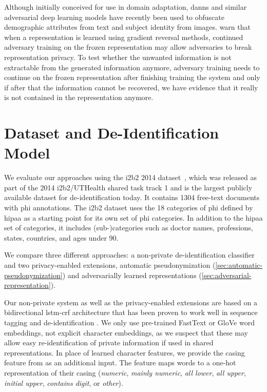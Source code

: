 %
Although initially conceived for use in domain adaptation, \acp{dann} and similar adversarial deep learning models have recently been used to obfuscate demographic attributes from text \citep{elazar2018adversarial,li2018towards} and subject identity \citep{feutry2018learning} from images.
%
\citet{elazar2018adversarial} warn that when a representation is learned using gradient reversal methods, continued adversary training on the frozen representation may allow adversaries to break representation privacy.
%
To test whether the unwanted information is not extractable from the generated information anymore, adversary training needs to continue on the frozen representation after finishing training the system and only if after that the information cannot be recovered, we have evidence that it really is not contained in the representation anymore.

\section{Dataset and De-Identification Model}\label{sec:deidentification-model}

We evaluate our approaches using the i2b2 2014
dataset~\citep{stubbs2015annotating}, which was released as part of
the 2014 i2b2/UTHealth shared task track 1 and is the largest publicly
available dataset for de-identification today.
%
It contains 1304 free-text documents with \ac{phi} annotations.
%
The i2b2 dataset uses the 18 categories of \ac{phi} defined by \ac{hipaa} as a starting point for its own set of \ac{phi} categories.
%
In addition to the \ac{hipaa} set of categories, it includes (sub-)categories such as doctor names, professions, states, countries, and ages under 90.

%
We compare three different approaches: a non-private de-identification classifier and two privacy-enabled extensions, automatic pseudonymization (\cref{sec:automatic-pseudonymization}) and adversarially learned representations (\cref{sec:adversarial-representation}).

%
Our non-private system as well as the privacy-enabled extensions are based on a bidirectional \ac{lstm}-\ac{crf} architecture that has been proven to work well in sequence tagging \citep{huang2015bidirectional,lample2016neural} and de-identification \citep{dernoncourt2017identification,liu2017identification}.
%
We only use pre-trained FastText \citep{bojanowski2017enriching} or GloVe \citep{pennington2014glove} word embeddings, not explicit character embeddings, as we suspect that these may allow easy re-identification of private information if used in shared representations.
%
In place of learned character features, we provide the casing feature from \citet{reimers2017optimal} as an additional input.
%
The feature maps words to a one-hot representation of their casing (\textit{numeric}, \textit{mainly numeric}, \textit{all lower}, \textit{all upper}, \textit{initial upper}, \textit{contains digit}, or \textit{other}).


